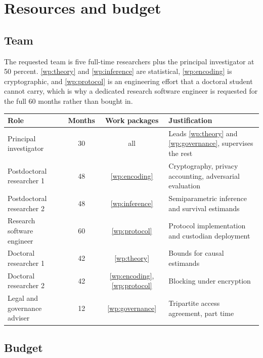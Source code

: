 \section{Resources and budget}
\label{sec:budget}

\subsection{Team}

The requested team is five full-time researchers plus the principal investigator at 50 percent.
\ref{wp:theory} and \ref{wp:inference} are statistical, \ref{wp:encoding} is cryptographic, and
\ref{wp:protocol} is an engineering effort that a doctoral student cannot carry, which is why a
dedicated research software engineer is requested for the full 60 months rather than bought in.

\begin{center}
\small
\begin{tabular}{@{}l c c L{6.4cm}@{}}
  \toprule
  Role & Months & Work packages & Justification \\
  \midrule
  Principal investigator      & 30 & all              & Leads \ref{wp:theory} and \ref{wp:governance}, supervises the rest \\
  Postdoctoral researcher 1   & 48 & \ref{wp:encoding} & Cryptography, privacy accounting, adversarial evaluation \\
  Postdoctoral researcher 2   & 48 & \ref{wp:inference} & Semiparametric inference and survival estimands \\
  Research software engineer  & 60 & \ref{wp:protocol} & Protocol implementation and custodian deployment \\
  Doctoral researcher 1       & 42 & \ref{wp:theory}   & Bounds for causal estimands \\
  Doctoral researcher 2       & 42 & \ref{wp:encoding}, \ref{wp:protocol} & Blocking under encryption \\
  Legal and governance adviser & 12 & \ref{wp:governance} & Tripartite access agreement, part time \\
  \bottomrule
\end{tabular}
\end{center}

\subsection{Budget}

